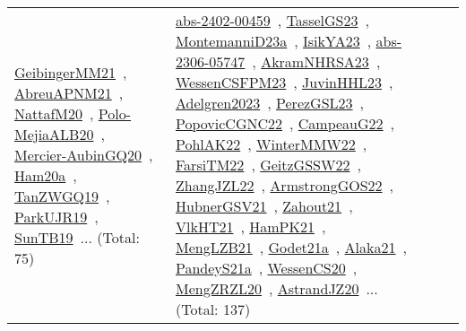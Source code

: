 {\begin{longtable}{lp{3cm}>{\raggedright\arraybackslash}p{6cm}>{\raggedright\arraybackslash}p{6cm}>{\raggedright\arraybackslash}p{8cm}}
\href{../works/GeibingerMM21.pdf}{GeibingerMM21}~\cite{GeibingerMM21}, \href{../works/AbreuAPNM21.pdf}{AbreuAPNM21}~\cite{AbreuAPNM21}, \href{../works/NattafM20.pdf}{NattafM20}~\cite{NattafM20}, \href{../works/Polo-MejiaALB20.pdf}{Polo-MejiaALB20}~\cite{Polo-MejiaALB20}, \href{../works/Mercier-AubinGQ20.pdf}{Mercier-AubinGQ20}~\cite{Mercier-AubinGQ20}, \href{../works/Ham20a.pdf}{Ham20a}~\cite{Ham20a}, \href{../works/TanZWGQ19.pdf}{TanZWGQ19}~\cite{TanZWGQ19}, \href{../works/ParkUJR19.pdf}{ParkUJR19}~\cite{ParkUJR19}, \href{../works/SunTB19.pdf}{SunTB19}~\cite{SunTB19}... (Total: 75) & \href{../works/abs-2402-00459.pdf}{abs-2402-00459}~\cite{abs-2402-00459}, \href{../works/TasselGS23.pdf}{TasselGS23}~\cite{TasselGS23}, \href{../works/MontemanniD23a.pdf}{MontemanniD23a}~\cite{MontemanniD23a}, \href{../works/IsikYA23.pdf}{IsikYA23}~\cite{IsikYA23}, \href{../works/abs-2306-05747.pdf}{abs-2306-05747}~\cite{abs-2306-05747}, \href{../works/AkramNHRSA23.pdf}{AkramNHRSA23}~\cite{AkramNHRSA23}, \href{../works/WessenCSFPM23.pdf}{WessenCSFPM23}~\cite{WessenCSFPM23}, \href{../works/JuvinHHL23.pdf}{JuvinHHL23}~\cite{JuvinHHL23}, \href{../works/Adelgren2023.pdf}{Adelgren2023}~\cite{Adelgren2023}, \href{../works/PerezGSL23.pdf}{PerezGSL23}~\cite{PerezGSL23}, \href{../works/PopovicCGNC22.pdf}{PopovicCGNC22}~\cite{PopovicCGNC22}, \href{../works/CampeauG22.pdf}{CampeauG22}~\cite{CampeauG22}, \href{../works/PohlAK22.pdf}{PohlAK22}~\cite{PohlAK22}, \href{../works/WinterMMW22.pdf}{WinterMMW22}~\cite{WinterMMW22}, \href{../works/FarsiTM22.pdf}{FarsiTM22}~\cite{FarsiTM22}, \href{../works/GeitzGSSW22.pdf}{GeitzGSSW22}~\cite{GeitzGSSW22}, \href{../works/ZhangJZL22.pdf}{ZhangJZL22}~\cite{ZhangJZL22}, \href{../works/ArmstrongGOS22.pdf}{ArmstrongGOS22}~\cite{ArmstrongGOS22}, \href{../works/HubnerGSV21.pdf}{HubnerGSV21}~\cite{HubnerGSV21}, \href{../works/Zahout21.pdf}{Zahout21}~\cite{Zahout21}, \href{../works/VlkHT21.pdf}{VlkHT21}~\cite{VlkHT21}, \href{../works/HamPK21.pdf}{HamPK21}~\cite{HamPK21}, \href{../works/MengLZB21.pdf}{MengLZB21}~\cite{MengLZB21}, \href{../works/Godet21a.pdf}{Godet21a}~\cite{Godet21a}, \href{../works/Alaka21.pdf}{Alaka21}~\cite{Alaka21}, \href{../works/PandeyS21a.pdf}{PandeyS21a}~\cite{PandeyS21a}, \href{../works/WessenCS20.pdf}{WessenCS20}~\cite{WessenCS20}, \href{../works/MengZRZL20.pdf}{MengZRZL20}~\cite{MengZRZL20}, \href{../works/AstrandJZ20.pdf}{AstrandJZ20}~\cite{AstrandJZ20}... (Total: 137)\\

\end{longtable}}
